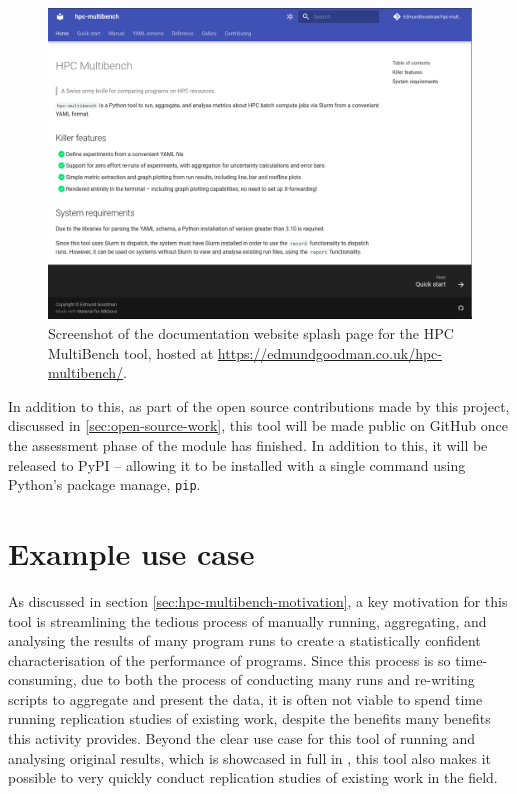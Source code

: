\begin{figure}[H]
    \centering
    \includegraphics[width=\textwidth]{images/4_tooling/implementation/documentation_splash.png}
    \caption{Screenshot of the documentation website splash page for the HPC MultiBench tool, hosted at \url{https://edmundgoodman.co.uk/hpc-multibench/}.}
    \label{fig:documentation_splash}
\end{figure}

In addition to this, as part of the open source contributions made by this project, discussed in \ref{sec:open-source-work}, this tool will be made public on GitHub once the assessment phase of the module has finished. In addition to this, it will be released to \acrfull{PyPI} -- allowing it to be installed with a single command using Python's package manage, \texttt{pip}.


\section{Example use case}
\label{sec:hpc-multibench-example-use-case}

As discussed in section \ref{sec:hpc-multibench-motivation}, a key motivation for this tool is streamlining the tedious process of manually running, aggregating, and analysing the results of many program runs to create a statistically confident characterisation of the performance of programs. Since this process is so time-consuming, due to both the process of conducting many runs and re-writing scripts to aggregate and present the data, it is often not viable to spend time running replication studies of existing work, despite the benefits many benefits this activity provides. Beyond the clear use case for this tool of running and analysing original results, which is showcased in full in , this tool also makes it possible to very quickly conduct replication studies of existing work in the field.

